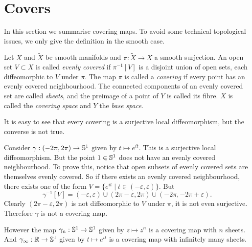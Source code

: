 

\section{Covers}

In this section we summarise covering maps.
To avoid some technical topological issues, we only give the definition in the smooth case.
\begin{definition}
\label{def:covering map}
\textup{\cite[p.~56]{Hatcher}}
Let $X$ and $\tilde{X}$ be smooth manifolds and $\pi : \tilde{X} \to X$ a smooth surjection.
An open set $V \subset X$ is called \emph{evenly covered} if $\pi^{-1}[V]$ is a disjoint union of open sets, each diffeomorphic to $V$ under $\pi$.
The map $\pi$ is called a \emph{covering} if every point has an evenly covered neighbourhood.
The connected components of an evenly covered set are called \emph{sheets}, and the preimage of a point of $Y$ is called its fibre.
$X$ is called the \emph{covering space} and $Y$ the \emph{base space}.
\end{definition}

It is easy to see that every covering is a surjective local diffeomorphism, but the converse is not true.

\begin{example}
Consider $\gamma : (-2\pi, 2\pi) \to \mathbb{S}^1$ given by $t \mapsto e^{it}$.
This is a surjective local diffeomorphism.
But the point $1 \in \mathbb{S}^1$ does not have an evenly covered neighbourhood.
To prove this, notice that open subsets of evenly covered sets are themselves evenly covered.
So if there exists an evenly covered neighbourhood, there exists one of the form $V = \{ e^{it} \mid t \in (-\varepsilon,\varepsilon) \}$.
But 
\[
\gamma^{-1}[V] = (-\varepsilon,\varepsilon) \cup (2\pi - \varepsilon,2\pi) \cup (-2\pi,-2\pi+\varepsilon).
\]
Clearly $(2\pi - \varepsilon,2\pi)$ is not diffeomorphic to $V$ under $\pi$, it is not even surjective.
Therefore $\gamma$ is not a covering map.

However the map $\gamma_n : \mathbb{S}^1 \to \mathbb{S}^1$ given by $z \mapsto z^n$ is a covering map with $n$ sheets.
And $\gamma_\infty : \mathbb{R} \to \mathbb{S}^1$ given by $t \mapsto e^{it}$ is a covering map with infinitely many sheets.
\end{example}

